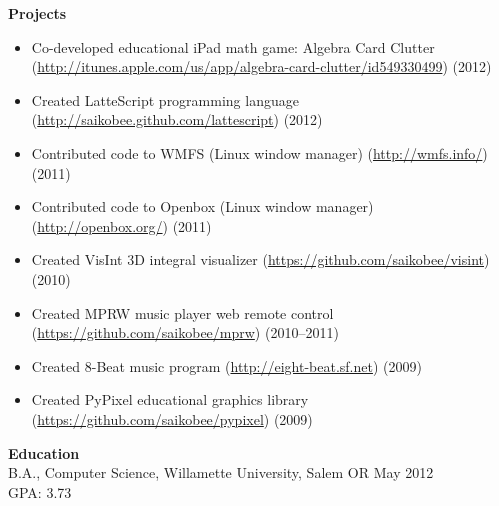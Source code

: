 \documentclass[10pt]{article}
\begin{document}
\medskip
\noindent \textbf{Projects} \hrulefill
\begin{itemize}
\item Co-developed educational iPad math game: Algebra Card Clutter \\
(\url{http://itunes.apple.com/us/app/algebra-card-clutter/id549330499})
(2012)
\item Created LatteScript programming language
    (\url{http://saikobee.github.com/lattescript}) (2012)
\item Contributed code to WMFS (Linux window manager)
    (\url{http://wmfs.info/}) (2011)
\item Contributed code to Openbox (Linux window manager)
    (\url{http://openbox.org/}) (2011)
\item Created VisInt 3D integral visualizer
    (\url{https://github.com/saikobee/visint}) (2010)
\item Created MPRW music player web remote control
    (\url{https://github.com/saikobee/mprw}) (2010\---2011)
\item Created 8-Beat music program
    (\url{http://eight-beat.sf.net}) (2009)
\item Created PyPixel educational graphics library
    (\url{https://github.com/saikobee/pypixel}) (2009)
\end{itemize}


\medskip
\noindent \textbf{Education} \hrulefill \\
\hangindent=24pt
B.A., Computer Science, Willamette University, Salem OR
May 2012 \\
GPA: 3.73
\end{document}
